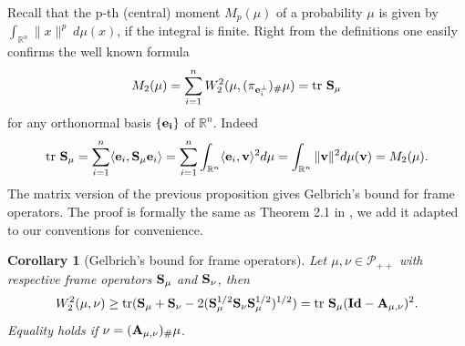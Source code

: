 \documentclass{amsart}
\numberwithin{equation}{section}
\newcommand\cP{{\mathcal P}}
\newcommand\bA{{\bf A}}
\newcommand\R{{\mathbb R}}
\newcommand\id{{\operatorname{\bf Id}}}
\newcommand\tr{{\operatorname{tr}}}
\theoremstyle{plain}
\newtheorem{corollary}[subsection]{Corollary}
\theoremstyle{definition}
\begin{document}
Recall that the p-th (central) moment $M_p(\mu)$ of a probability $\mu$ is given by $\int_{\R^n}\|x\|^p \  d \mu(x) $, if the integral is finite. 
Right from the definitions one easily confirms the well known formula 
\begin{equation}
    M_2(\mu)=\sum^n_{i=1} W^2_2(\mu, (\pi_{ {\bf e}_i^{\perp}})_{\#}\mu)= \tr\ {\bf S_{\mu}}
\end{equation}
for any orthonormal basis $\{\bf e_i\}$ of $\R^n$. 
Indeed 
$$
\tr\ {\bf S}_{\mu}=\sum^n_{i=1}\langle {\bf e}_i, {\bf S}_{\mu} {\bf e}_i\rangle =\sum^n_{i=1} \int_{\mathbb{R}^n}  \langle{\bf e}_i, {\bf v}\rangle^2  d\mu
=\int_{\mathbb{R}^n}  \|{\bf v}\|^2  d\mu({\bf v}) =M_2(\mu).
$$
The matrix version of the previous proposition gives Gelbrich's bound \cite{Gelbrich90} for frame operators. 
The proof is formally the same as Theorem 2.1 in \cite{cuesta1996lower}, we add it adapted to our conventions for convenience. 
\begin{corollary}[Gelbrich's bound \cite{Gelbrich90} for frame operators]\label{prop_lower_est}
Let $\mu,\nu \in \cP_{++}$ with respective frame operators ${\bf S}_{\mu}$ and ${\bf S}_{\nu}$, then  
\begin{equation}\label{matrix_ineq_lower_est}
    W^2_2(\mu,\nu)\geq \tr({\bf S}_{\mu}+{\bf S}_{\nu}-2({\bf S}_{\mu}^{1/2}{\bf S}_{\nu}{\bf S}_{\mu}^{1/2})^{1/2})= \tr\ {\bf S}_{\mu}({\bf \id}-\bA_{\mu, \nu})^2. 
\end{equation}
Equality holds if $\nu=(\bA_{\mu,\nu})_{\#}\mu$.
\end{corollary}
\end{document}
